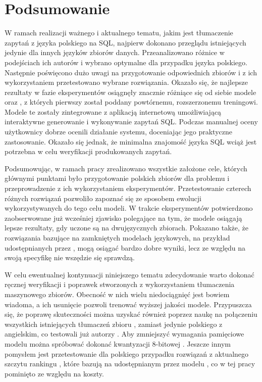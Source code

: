 \chapter{Podsumowanie}

W ramach realizacji ważnego i aktualnego tematu, jakim jest tłumaczenie zapytań z języka polskiego na SQL, najpierw dokonano przeglądu istniejących jedynie dla innych języków zbiorów danych. Przeanalizowano różnice w podejściach ich autorów i wybrano optymalne dla przypadku języka polskiego. Następnie poświęcono dużo uwagi na przygotowanie odpowiednich zbiorów i z ich wykorzystaniem przetestowano wybrane rozwiązania. Okazało się, że najlepsze rezultaty w fazie eksperymentów osiągnęły znacznie różniące się od siebie modele  oraz , z których pierwszy został poddany powtórnemu, rozszerzonemu treningowi. Modele te zostały zintegrowane z aplikacją internetową umożliwiającą interaktywne generowanie i wykonywanie zapytań SQL. Podczas manualnej oceny użytkownicy dobrze ocenili działanie systemu, doceniając jego praktyczne zastosowanie. Okazało się jednak, że minimalna znajomość języka SQL wciąż jest potrzebna w celu weryfikacji produkowanych zapytań.

Podsumowując, w ramach pracy zrealizowano wszystkie założone cele, których głównymi punktami było przygotowanie polskich zbiorów dla problemu  i przeprowadzenie z ich wykorzystaniem eksperymentów. Przetestowanie czterech różnych rozwiązań pozwoliło zapoznać się ze sposobem ewolucji wykorzystywanych do tego celu modeli. W trakcie eksperymentów potwierdzono zaobserwowane już wcześniej zjawisko polegające na tym, że modele osiągają lepsze rezultaty, gdy uczone są na dwujęzycznych zbiorach. Pokazano także, że rozwiązania bazujące na zamkniętych modelach językowych, na przykład udostępnianych przez , mogą osiągać bardzo dobre wyniki, lecz ze względu na swoją specyfikę nie wszędzie się sprawdzą.

W celu ewentualnej kontynuacji niniejszego tematu zdecydowanie warto dokonać ręcznej weryfikacji i poprawek stworzonych z wykorzystaniem tłumaczenia maszynowego zbiorów. Obecność w nich wielu niedociągnięć jest bowiem wiadoma, a ich usunięcie pozwoli trenować wyższej jakości modele. Przypuszcza się, że poprawę skuteczności można uzyskać również poprzez naukę na połączeniu wszystkich istniejących tłumaczeń zbioru , zamiast jedynie polskiego z angielskim, co testowali już autorzy  . Aby zmniejszyć wymagania pamięciowe modelu  można spróbować dokonać kwantyzacji 8-bitowej . Jeszcze innym pomysłem jest przetestowanie dla polskiego przypadku rozwiązań z aktualnego szczytu rankingu , które bazują na udostępnianym przez  modelu , co w tej pracy pominięto ze względu na koszty.